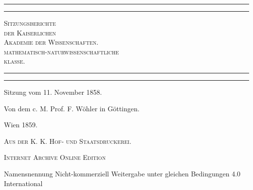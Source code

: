 \documentclass[a4paper, 11pt, oneside]{article}
\begin{document}
\swabfamily
\renewcommand{\contentsname}{
\swabfamily{Inhaltsverzeichnis}
}
\begin{titlepage} %
	\centering %

	
	\rule{\textwidth}{1.6pt}\vspace*{-\baselineskip}\vspace*{2pt} %
	\rule{\textwidth}{0.4pt} %
	
	\vspace{1\baselineskip} %
	
	{\scshape\Huge Sitzungsberichte\\[1.25pt] der Kaiserlichen\\[1.25pt] Akademie der Wissenschaften.\\[1.25pt] mathematisch-naturwissenschaftliche\\[1.25pt] klasse.\\[1.25pt]}
	
	\vspace{1\baselineskip} %

	\rule{\textwidth}{0.4pt}\vspace*{-\baselineskip}\vspace{3.2pt} %
	\rule{\textwidth}{1.6pt} %
	
	\vspace{1\baselineskip} %
	
	
	{\LARGE Sitzung vom 11. November 1858.} %
	
	\vspace*{1\baselineskip} %
	
    {\LARGE Von dem c. M. Prof. F. Wöhler in Göttingen.} %
    
    \vspace*{\fill}

	\vspace{1\baselineskip}

	{\Large Wien 1859.}
	
	{\Large\scshape{Aus der K. K. Hof- und Staatsdruckerei.}}
	
	\vspace{0.5\baselineskip} %

    \Large\scshape Internet Archive Online Edition  %
	
	{\Large Namensnennung Nicht-kommerziell Weitergabe unter gleichen Bedingungen 4.0 International} %
\end{titlepage}
\end{document}
